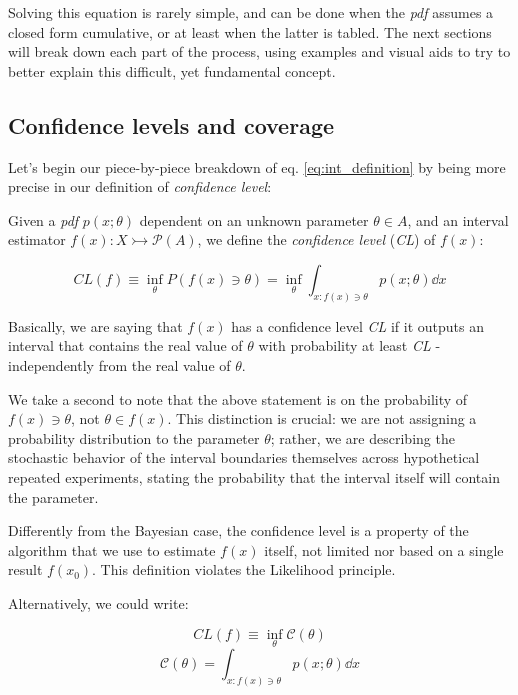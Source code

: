 Solving this equation is rarely simple, and can be done when the \emph{pdf} assumes a closed form cumulative, or at least when the latter is tabled. The next sections will break down each part of the process, using examples and visual aids to try to better explain this difficult, yet fundamental concept.

\subsection{Confidence levels and coverage}
Let's begin our piece-by-piece breakdown of eq. \ref{eq:int_definition} by being more precise in our definition of \emph{confidence level}:

\begin{definition}
	Given a \emph{pdf} $p(x;\theta)$ dependent on an unknown parameter $\theta\in A$, and an interval estimator $f(x): X\rightarrowtail \mathcal{P}(A)$, we define the \emph{confidence level} (\emph{CL}) of $f(x)$:
	
	\[
	CL(f) \equiv \inf_{\theta} P(f(x)\ni\theta) = \inf_\theta\int_{x:f(x)\ni\theta} p(x;\theta)\dd x
	\]
\end{definition} 

Basically, we are saying that $f(x)$ has a confidence level \emph{CL} if it outputs an interval that contains the real value of $\theta$ with probability at least \emph{CL} - independently from the real value of $\theta$.

We take a second to note that the above statement is on the probability of $f(x)\ni\theta$, not $\theta\in f(x)$. This distinction is crucial: we are not assigning a probability distribution to the parameter $\theta$; rather, we are describing the stochastic behavior of the interval boundaries themselves across hypothetical repeated experiments, stating the probability that the interval itself will contain the parameter.

Differently from the Bayesian case, the confidence level is a property of the algorithm that we use to estimate $f(x)$ itself, not limited nor based on a single result $f(x_0)$. This definition violates the Likelihood principle.

Alternatively, we could write:

	\[
	CL(f) \equiv \inf_\theta \mathcal{C}(\theta)
	\]
	\begin{equation}
	\mathcal{C}(\theta) = \int_{x:f(x)\ni\theta} p(x;\theta)\dd x
	\label{eq:coverage}
	\end{equation}


